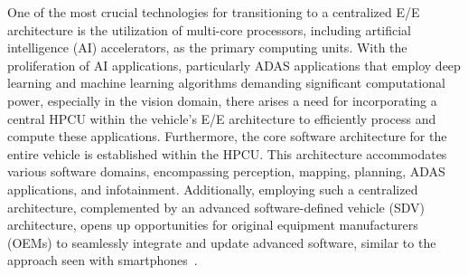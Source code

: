     One of the most crucial technologies for transitioning to a centralized E/E architecture is the utilization of multi-core processors, including artificial intelligence (AI) accelerators, as the primary computing units. With the proliferation of AI applications, particularly ADAS applications that employ deep learning and machine learning algorithms demanding significant computational power, especially in the vision domain, there arises a need for incorporating a central HPCU within the vehicle's E/E architecture to efficiently process and compute these applications. Furthermore, the core software architecture for the entire vehicle is established within the HPCU. This architecture accommodates various software domains, encompassing perception, mapping, planning, ADAS applications, and infotainment. Additionally, employing such a centralized architecture, complemented by an advanced software-defined vehicle (SDV) architecture, opens up opportunities for original equipment manufacturers (OEMs) to seamlessly integrate and update advanced software, similar to the approach seen with smartphones~\cite{askaripoor2022architecture,9613692}.
    
